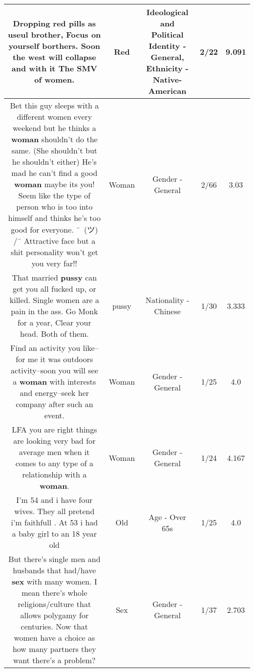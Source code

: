 \documentclass[11pt]{article}
\newlength\mylength
\begin{document}
\begin{center}
\begin{longtable}{|C{.65\mylength}|C{.30\mylength}|C{.12\mylength}|C{.12\mylength}|C{.12\mylength}|}
  \small Dropping \textbf{r\textbf{ed}} pills as useul brother, Focus on yourself borthers. Soon the west will collapse and with it The SMV of women.\normalsize   & Red &  Ideological and Political Identity - General, Ethnicity - Native-American & 2/22 & 9.091 \\  \hline
  \small Bet this guy sleeps with a different women every weekend but he thinks a \textbf{woman} shouldn't do the same. (She shouldn't but he shouldn't either) He's mad he can't find a good \textbf{woman} maybe its you! Seem like the type of person who is too into himself and thinks he's too good for everyone. ¯\ (ツ) /¯ Attractive face but a shit personality won't get you very far!!\normalsize   & Woman & Gender - General & 2/66 & 3.03 \\  \hline
  \small That married \textbf{pussy} can get you all fucked up, or killed. Single women are a pain in the ass. Go Monk for a year, Clear your head. Both of them.\normalsize   & pussy & Nationality - Chinese & 1/30 & 3.333 \\  \hline
  \small Find an activity you like--for me it was outdoors activity--soon you will see a \textbf{woman} with interests and energy--seek her company after such an event.\normalsize   & Woman & Gender - General & 1/25 & 4.0 \\  \hline
  \small LFA you are right things are looking very bad for average men when it comes to any type of a relationship with a \textbf{woman}.\normalsize   & Woman & Gender - General & 1/24 & 4.167 \\  \hline
  \small I'm 54 and i have four wives. They all pretend i'm faithfull . At 53 i had a baby girl to an 18 year old\normalsize   & Old & Age - Over 65s & 1/25 & 4.0 \\  \hline
  \small But there's single men and husbands that had/have \textbf{sex} with many women. I mean there's whole religions/culture that allows polygamy for centuries. Now that women have a choice as how many partners they want there's a problem?\normalsize   & Sex & Gender - General & 1/37 & 2.703 \\  \hline

\end{longtable}
\end{center}
\end{document}
